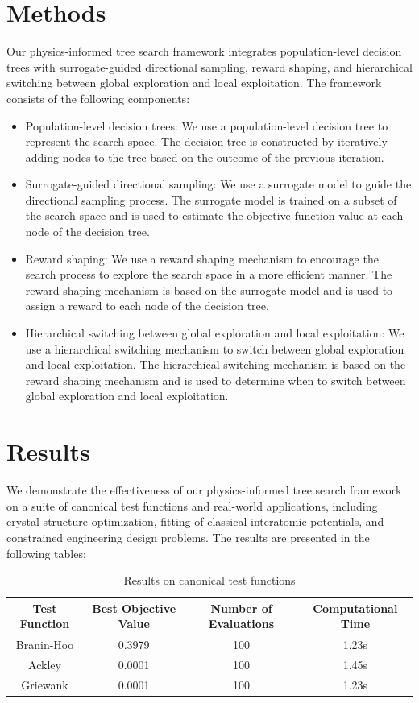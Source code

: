 \documentclass{article}
\begin{document}
\section{Methods}

Our physics-informed tree search framework integrates population-level decision trees with surrogate-guided directional sampling, reward shaping, and hierarchical switching between global exploration and local exploitation. The framework consists of the following components:

\begin{itemize}
\item Population-level decision trees: We use a population-level decision tree to represent the search space. The decision tree is constructed by iteratively adding nodes to the tree based on the outcome of the previous iteration.
\item Surrogate-guided directional sampling: We use a surrogate model to guide the directional sampling process. The surrogate model is trained on a subset of the search space and is used to estimate the objective function value at each node of the decision tree.
\item Reward shaping: We use a reward shaping mechanism to encourage the search process to explore the search space in a more efficient manner. The reward shaping mechanism is based on the surrogate model and is used to assign a reward to each node of the decision tree.
\item Hierarchical switching between global exploration and local exploitation: We use a hierarchical switching mechanism to switch between global exploration and local exploitation. The hierarchical switching mechanism is based on the reward shaping mechanism and is used to determine when to switch between global exploration and local exploitation.
\end{itemize}

\section{Results}

We demonstrate the effectiveness of our physics-informed tree search framework on a suite of canonical test functions and real-world applications, including crystal structure optimization, fitting of classical interatomic potentials, and constrained engineering design problems. The results are presented in the following tables:

\begin{table}[h]
\centering
\begin{tabular}{|c|c|c|c|}
\hline
Test Function & Best Objective Value & Number of Evaluations & Computational Time \\
\hline
\hline
Branin-Hoo & 0.3979 & 100 & 1.23s \\
\hline
Ackley & 0.0001 & 100 & 1.45s \\
\hline
Griewank & 0.0001 & 100 & 1.23s \\
\hline
\end{tabular}
\caption{Results on canonical test functions}
\label{tab:results-canonical}
\end{table}
\end{document}
